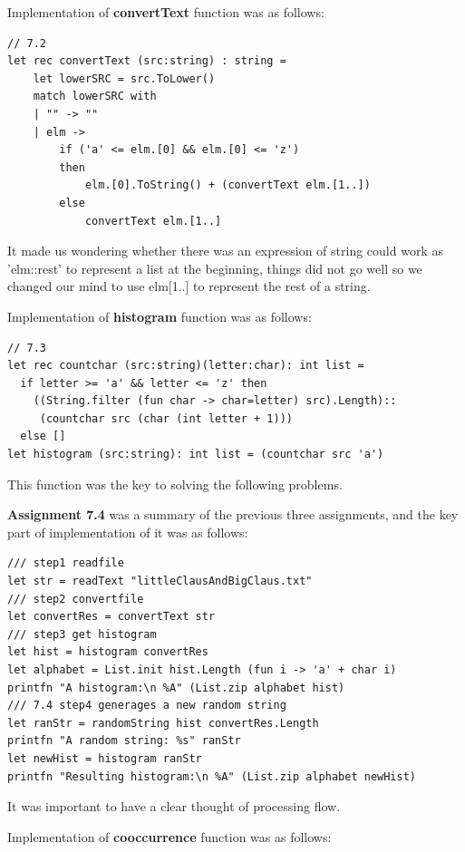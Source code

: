\documentclass{article}
\begin{document}
Implementation of \textbf{convertText} function was as follows:

\begin{lstlisting}
// 7.2
let rec convertText (src:string) : string = 
    let lowerSRC = src.ToLower()
    match lowerSRC with
    | "" -> ""
    | elm -> 
        if ('a' <= elm.[0] && elm.[0] <= 'z')
        then 
            elm.[0].ToString() + (convertText elm.[1..])
        else
            convertText elm.[1..]
\end{lstlisting}

It made us wondering whether there was an expression of string could work as 'elm::rest' to represent a list at the beginning, things did not go well so we changed our mind to use elm[1..] to represent the rest of a string.

Implementation of \textbf{histogram} function was as follows:

\begin{lstlisting}
// 7.3
let rec countchar (src:string)(letter:char): int list = 
  if letter >= 'a' && letter <= 'z' then 
    ((String.filter (fun char -> char=letter) src).Length)::
     (countchar src (char (int letter + 1)))
  else []
let histogram (src:string): int list = (countchar src 'a')
\end{lstlisting}

This function was the key to solving the following problems.

\textbf{Assignment 7.4} was a summary of the previous three assignments, and the key part of implementation of it was as follows:
\begin{lstlisting}
/// step1 readfile
let str = readText "littleClausAndBigClaus.txt"
/// step2 convertfile
let convertRes = convertText str
/// step3 get histogram
let hist = histogram convertRes
let alphabet = List.init hist.Length (fun i -> 'a' + char i)
printfn "A histogram:\n %A" (List.zip alphabet hist)
/// 7.4 step4 generages a new random string
let ranStr = randomString hist convertRes.Length
printfn "A random string: %s" ranStr
let newHist = histogram ranStr
printfn "Resulting histogram:\n %A" (List.zip alphabet newHist)
\end{lstlisting}

It was important to have a clear thought of processing flow.

Implementation of \textbf{cooccurrence} function was as follows:
\end{document}
